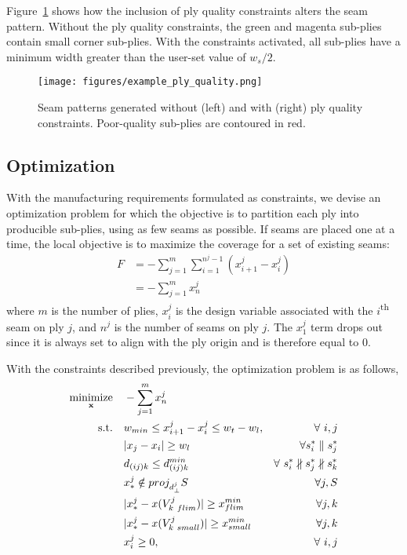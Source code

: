 Figure~\ref{fig:example_ply_quality} shows how the inclusion of ply quality constraints alters the seam pattern. Without the ply quality constraints, the green and magenta sub-plies contain small corner sub-plies. With the constraints activated, all sub-plies have a minimum width greater than the user-set value of $w_s/2$.

\begin{figure}[h]
    \centering
    \texttt{[image: figures/example\_ply\_quality.png]}
    \caption{Seam patterns generated without (left) and with (right) ply quality constraints. Poor-quality sub-plies are contoured in red.}
    \label{fig:example_ply_quality}
\end{figure}

\subsection{Optimization}
\label{sec:optimization}
With the manufacturing requirements formulated as constraints, we devise an optimization problem for which the objective is to partition each ply into producible sub-plies, using as few seams as possible. If seams are placed one at a time, the local objective is to maximize the coverage for a set of existing seams:
\begin{equation}
\label{eq:strip_width_max}
\begin{split}
    F & = -\sum_{j=1}^m \sum_{i=1}^{n^j-1} (x_{i+1}^j - x_i^j) \\
    & = -\sum_{j=1}^m x_{n}^j
\end{split}
\end{equation}
where $m$ is the number of plies, $x_i^j$ is the design variable associated with the $i$\textsuperscript{th} seam on ply $j$, and $n^j$ is the number of seams on ply $j$. The $x_1^j$ term drops out since it is always set to align with the ply origin and is therefore equal to 0.

With the constraints described previously, the optimization problem is as follows,
\begin{equation}
\begin{aligned}
\mathop{ \text{minimize}} \limits_{\mathbf{x}} \quad & -\sum_{j=1}^m x_{n}^j&\\
\textrm{s.t.} \quad & w_{min} \leq x_{i+1}^j - x_{i}^j \leq w_t - w_l, & \forall \ i, j \\
& |x_j - x_i| \geq w_l & \forall s_i^* \parallel s_j^* \\
& d_{(ij)k} \leq d_{(ij)k}^{min} & \forall \ s_i^* \nparallel s_j^* \nparallel s_k^*\\
& x_*^j \notin proj_{d_{\perp}^j} S & \forall j, S \\
& |x_*^j - x(V_{k \ flim}^j)| \geq x_{flim}^{min} & \forall j, k \\
& |x_*^j - x(V_{k \ small}^j)| \geq x_{small}^{min} & \forall j, k \\
& x_i^j \geq 0, & \forall \ i, j \\
\end{aligned}
\label{eq:opt}
\end{equation}


